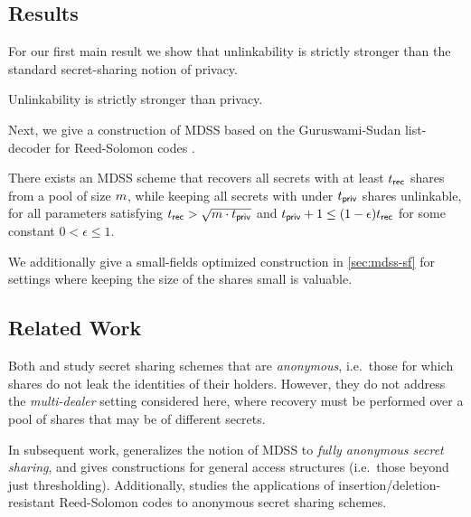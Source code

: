 \subsection{Results}

For our first main result we show that unlinkability is strictly stronger than the standard secret-sharing notion of privacy.

\begin{theorem*}
	Unlinkability is strictly stronger than privacy.
\end{theorem*}

Next, we give a construction of MDSS based on the Guruswami-Sudan list-decoder for Reed-Solomon codes \cite{FOCS:GurSud98}.

\begin{theorem*}
	There exists an MDSS scheme that recovers all secrets with at least $t_{\mathsf{rec}}$ shares from a pool of size $m$, while keeping all secrets with under $t_{\mathsf{priv}}$ shares unlinkable, for all parameters satisfying $t_{\mathsf{rec}} > \sqrt{m \cdot t_{\mathsf{priv}}}$ and $t_{\mathsf{priv}} + 1 \leq (1 - \epsilon)t_{\mathsf{rec}}$ for some constant $0 < \epsilon  \leq 1$.
\end{theorem*}

We additionally give a small-fields optimized construction in \cref{sec:mdss-sf} for settings where keeping the size of the shares small is valuable.

\subsection{Related Work}

Both \cite{guillermo2003providing} and \cite{paskin2020cryptographic} study secret sharing schemes that are \emph{anonymous}, i.e.\ those for which shares do not leak the identities of their holders.
However, they do not address the \emph{multi-dealer} setting considered here, where recovery must be performed over a pool of shares that may be of different secrets.

In subsequent work, \cite{C:BGIJL25} generalizes the notion of MDSS to \emph{fully anonymous secret sharing}, and gives constructions for general access structures (i.e.\ those beyond just thresholding).
Additionally, \cite{con2025anonymous} studies the applications of insertion/deletion-resistant Reed-Solomon codes to anonymous secret sharing schemes.
